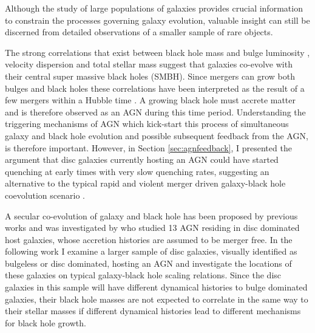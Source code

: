 
Although the study of large populations of galaxies provides crucial information to constrain the processes governing galaxy evolution, valuable insight can still be discerned from detailed observations of a smaller sample of rare objects. 

The strong correlations that exist between black hole mass and bulge luminosity \citep{marconi03, haringrix04}, velocity dispersion \citep{magorrian98, merrit01, kormendy11, hu08, mcconnell11} and total stellar mass \citep{cisternas11} suggest that galaxies co-evolve with their central super massive black holes (SMBH). Since mergers can grow both bulges and black holes these correlations have been interpreted as the result of a few mergers within a Hubble time \citep{peng07, hopkins08a, jahnke10}. A growing black hole must accrete matter and is therefore observed as an AGN during this time period. Understanding the triggering mechanisms of AGN which kick-start this process of simultaneous galaxy and black hole evolution and possible subsequent feedback from the AGN, is therefore important. However, in Section \ref{sec:agnfeedback}, I presented the argument that disc galaxies currently hosting an AGN could have started quenching at early times with very slow quenching rates, suggesting an alternative to the typical rapid and violent merger driven galaxy-black hole coevolution scenario \citep{hopkins08a}. 

A secular co-evolution of galaxy and black hole has been proposed by previous works \citep{greene10,jingo, cisternas11, simonise, schawinski11, kocevski12} and was investigated by \citet{Simmons13} who studied 13 AGN residing in disc dominated host galaxies, whose accretion histories are assumed to be merger free. In the following work I examine a larger sample of disc galaxies, visually identified as bulgeless or disc dominated, hosting an AGN and investigate the locations of these galaxies on typical galaxy-black hole scaling relations. Since the disc galaxies in this sample will have different dynamical histories to bulge dominated galaxies, their black hole masses are not expected to correlate in the same way to their stellar masses if different dynamical histories lead to different mechanisms for black hole growth. 



